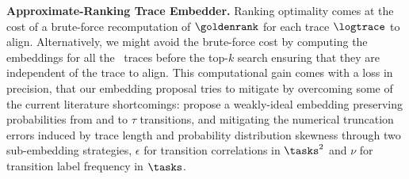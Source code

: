 \noindent
\textbf{Approximate-Ranking Trace Embedder.}\label{subsec:ate}
Ranking optimality comes at the cost of a brute-force recomputation of $\goldenrank$ for each trace $\logtrace$ to align. Alternatively, we might avoid the brute-force cost by
computing the embeddings for all the \unravelled\ traces
before the top-$k$ search ensuring that they are independent of the trace to align. %
This computational gain comes with a loss in precision, that our embedding proposal tries to mitigate by overcoming some of the current literature shortcomings: 
	 propose a weakly-ideal embedding
 preserving probabilities from and to $\tau$ transitions, and 
 mitigating the numerical truncation errors induced by trace length and probability distribution skewness through two 
sub-embedding strategies, $\epsilon$ for transition correlations in $\tasks^2$ and $\nu$ for transition label frequency in $\tasks$\cite{Bergami21}. 
%

